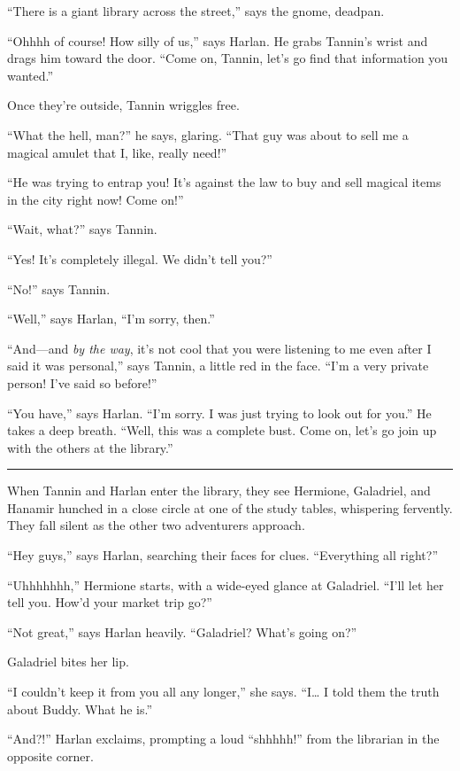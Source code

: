 \documentclass[smalldemyvopaper,11pt,twoside,onecolumn,openright,extrafontsizes]{memoir}
\begin{document}
``There is a giant library across the street,'' says the gnome, deadpan.

``Ohhhh of course! How silly of us,'' says Harlan. He grabs Tannin's
wrist and drags him toward the door. ``Come on, Tannin, let's go find
that information you wanted.''

Once they're outside, Tannin wriggles free.

``What the hell, man?'' he says, glaring. ``That guy was about to sell
me a magical amulet that I, like, really need!''

``He was trying to entrap you! It's against the law to buy and sell
magical items in the city right now! Come on!''

``Wait, what?'' says Tannin.

``Yes! It's completely illegal. We didn't tell you?''

``No!'' says Tannin.

``Well,'' says Harlan, ``I'm sorry, then.''

``And---and \emph{by the way}, it's not cool that you were listening to
me even after I said it was personal,'' says Tannin, a little red in the
face. ``I'm a very private person! I've said so before!''

``You have,'' says Harlan. ``I'm sorry. I was just trying to look out
for you.'' He takes a deep breath. ``Well, this was a complete bust.
Come on, let's go join up with the others at the library.''

\begin{center}\rule{0.5\linewidth}{\linethickness}\end{center}

When Tannin and Harlan enter the library, they see Hermione, Galadriel,
and Hanamir hunched in a close circle at one of the study tables,
whispering fervently. They fall silent as the other two adventurers
approach.

``Hey guys,'' says Harlan, searching their faces for clues. ``Everything
all right?''

``Uhhhhhhh,'' Hermione starts, with a wide-eyed glance at Galadriel.
``I'll let her tell you. How'd your market trip go?''

``Not great,'' says Harlan heavily. ``Galadriel? What's going on?''

Galadriel bites her lip.

``I couldn't keep it from you all any longer,'' she says. ``I\ldots{} I
told them the truth about Buddy. What he is.''

``And?!'' Harlan exclaims, prompting a loud ``shhhhh!'' from the
librarian in the opposite corner.
\end{document}
